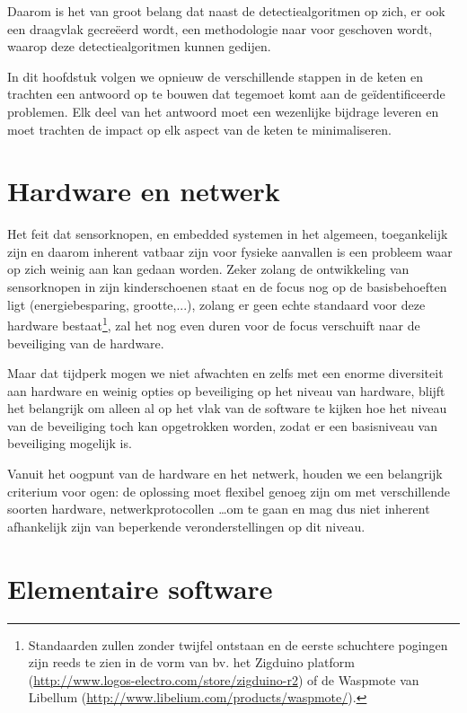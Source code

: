 Daarom is het van groot belang dat naast de detectiealgoritmen op zich, er ook
een draagvlak gecre\"eerd wordt, een methodologie naar voor geschoven wordt,
waarop deze detectiealgoritmen kunnen gedijen.

In dit hoofdstuk volgen we opnieuw de verschillende stappen in de keten en
trachten een antwoord op te bouwen dat tegemoet komt aan de ge\"identificeerde
problemen. Elk deel van het antwoord moet een wezenlijke bijdrage leveren en
moet trachten de impact op elk aspect van de keten te minimaliseren.

\section{Hardware en netwerk}
\label{section:solution-node-wsn}

Het feit dat sensorknopen, en embedded systemen in het algemeen, toegankelijk
zijn en daarom inherent vatbaar zijn voor fysieke aanvallen is een probleem
waar op zich weinig aan kan gedaan worden. Zeker zolang de ontwikkeling van
sensorknopen in zijn kinderschoenen staat en de focus nog op de basisbehoeften
ligt (energiebesparing, grootte,...), zolang er geen echte standaard voor deze
hardware bestaat\footnote{Standaarden zullen zonder twijfel ontstaan en de
eerste schuchtere pogingen zijn reeds te zien in de vorm van bv. het Zigduino
platform (\url{http://www.logos-electro.com/store/zigduino-r2}) of de Waspmote
van Libellum (\url{http://www.libelium.com/products/waspmote/}).}, zal het nog
even duren voor de focus verschuift naar de beveiliging van de hardware.

Maar dat tijdperk mogen we niet afwachten en zelfs met een enorme diversiteit
aan hardware en weinig opties op beveiliging op het niveau van hardware, blijft
het belangrijk om alleen al op het vlak van de software te kijken hoe het
niveau van de beveiliging toch kan opgetrokken worden, zodat er een basisniveau
van beveiliging mogelijk is.

Vanuit het oogpunt van de hardware en het netwerk, houden we een belangrijk
criterium voor ogen: de oplossing moet flexibel genoeg zijn om met
verschillende soorten hardware, netwerkprotocollen \dots om te gaan en mag dus
niet inherent afhankelijk zijn van beperkende veronderstellingen op dit niveau.

\section{Elementaire software}
\label{section:solution-software}


